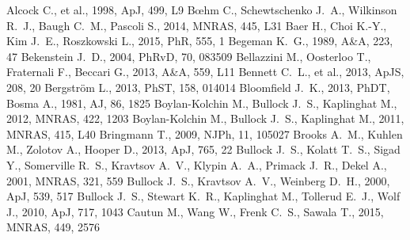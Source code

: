 \documentclass[a4wide,12pt]{book}
\begin{document}
\begin{thebibliography}{}
Alcock C., et al., 1998, ApJ, 499, L9 
 B{\oe}hm C., Schewtschenko J.~A., 
Wilkinson R.~J., Baugh C.~M., Pascoli S., 2014, MNRAS, 445, L31
Baer H., Choi K.-Y., Kim J.~E., Roszkowski L., 2015, PhR, 555, 1 
 Begeman K.~G., 1989, A\&A, 223, 47 
Bekenstein J.~D., 2004, PhRvD, 70, 083509 
 Bellazzini M., Oosterloo T., Fraternali F., Beccari G., 2013, A\&A, 559, L11 
 Bennett C.~L., et al., 2013, ApJS, 208, 20 
Bergstr{\"o}m L., 2013, PhST, 158, 014014
Bloomfield J.~K., 2013, PhDT, 
 Bosma 
A., 1981, AJ, 86, 1825 
 Boylan-Kolchin M., Bullock J.~S., Kaplinghat M., 2012, MNRAS, 422, 1203 
 Boylan-Kolchin M., Bullock J.~S., Kaplinghat M., 2011, MNRAS, 415, L40 
Bringmann T., 2009, NJPh, 11, 105027 
Brooks A.~M., Kuhlen M., Zolotov A., Hooper D., 2013, ApJ, 765, 22 
 Bullock J.~S., Kolatt T.~S., Sigad Y., 
Somerville R.~S., Kravtsov A.~V., Klypin A.~A., Primack J.~R., Dekel A., 
2001, MNRAS, 321, 559 
 Bullock J.~S., Kravtsov A.~V., Weinberg D.~H., 2000, ApJ, 539, 517 
 Bullock J.~S., Stewart K.~R., Kaplinghat 
M., Tollerud E.~J., Wolf J., 2010, ApJ, 717, 1043 
Cautun M., Wang W., Frenk C.~S., Sawala T., 2015, MNRAS, 449, 2576

\end{thebibliography}
\end{document}
